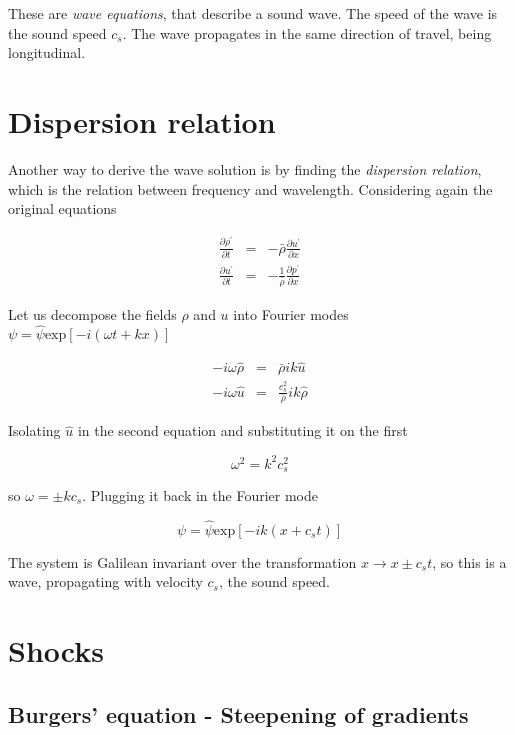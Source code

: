 These are {\it wave equations}, that describe a sound wave. The speed of the wave is the sound speed $c_s$. The wave propagates in the same direction of travel, being longitudinal. 

\section{Dispersion relation}

Another way to derive the wave solution is by finding the {\it dispersion relation}, which is the relation between frequency and wavelength. Considering again the original equations 

\begin{eqnarray}
\frac{\partial \rho^\prime}{\partial t}   &=& -\bar{\rho}\frac{\partial u^\prime}{\partial x}   \\
\frac{\partial u^\prime}{\partial t}   &=& -\frac{1}{\bar{\rho}} \frac{\partial p^\prime}{\partial x} 
\end{eqnarray}

Let us decompose the fields $\rho$ and $u$ into Fourier modes $\psi = \hat{\psi} \mbox{exp}[-i(\omega t + kx)]$

\begin{eqnarray}
-i\omega\hat{\rho} &=& \bar{\rho} i k \hat{u} \\
-i\omega\hat{u}  &=& \frac{c_s^2}{\bar{\rho}}ik\hat{\rho}  
\end{eqnarray}

Isolating $\hat{u}$ in the second equation and substituting it on the first 

\begin{equation}
\omega^2= k^2 c_s^2 
\end{equation}

so $\omega = \pm k c_s$. Plugging it back in the Fourier mode 

\begin{equation}
\psi = \hat{\psi} \mbox{exp}[-i k ( x + c_s t)]
\end{equation}

The system is Galilean invariant over the transformation $x \longrightarrow x \pm c_s t$, so this is a wave, propagating with velocity $c_s$, the sound speed. 


\section{Shocks}


\subsection{Burgers' equation - Steepening of gradients}

